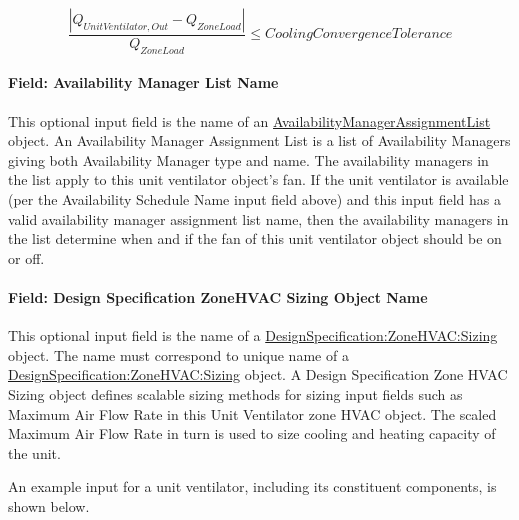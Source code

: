 \begin{equation}
\frac{{\left| {{Q_{UnitVentilator,Out}} - {Q_{ZoneLoad}}} \right|}}{{{Q_{ZoneLoad}}}} \le CoolingConvergenceTolerance
\end{equation}

\paragraph{Field: Availability Manager List Name}\label{field-availability-manager-list-name-1-000}

This optional input field is the name of an \hyperref[availabilitymanagerassignmentlist]{AvailabilityManagerAssignmentList} object. An Availability Manager Assignment List is a list of Availability Managers giving both Availability Manager type and name. The availability managers in the list apply to this unit ventilator object's fan. If the unit ventilator is available (per the Availability Schedule Name input field above) and this input field has a valid availability manager assignment list name, then the availability managers in the list determine when and if the fan of this unit ventilator object should be on or off.

\paragraph{Field: Design Specification ZoneHVAC Sizing Object Name}\label{field-design-specification-zonehvac-sizing-object-name-2}

This optional input field is the name of a \hyperref[designspecificationzonehvacsizing]{DesignSpecification:ZoneHVAC:Sizing} object. The name must correspond to unique name of a \hyperref[designspecificationzonehvacsizing]{DesignSpecification:ZoneHVAC:Sizing} object. A Design Specification Zone HVAC Sizing object defines scalable sizing methods for sizing input fields such as Maximum Air Flow Rate in this Unit Ventilator zone HVAC object. The scaled Maximum Air Flow Rate in turn is used to size cooling and heating capacity of the unit.

An example input for a unit ventilator, including its constituent components, is shown below.

